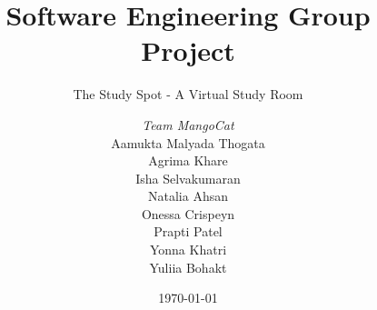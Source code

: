 \documentclass[a4paper, 12pt]{report}
\title{Software Engineering Group Project}
\subtitle{The Study Spot - A Virtual Study Room}%
\author{\textit{Team MangoCat}\\   %
Aamukta Malyada Thogata\\                        %
Agrima Khare\\                        %
Isha Selvakumaran\\                      %
Natalia Ahsan\\                       %
Onessa Crispeyn\\                       %
Prapti Patel\\                        %
Yonna Khatri\\                      %
Yuliia Bohakt\\                      %
}
\date{\today}
\begin{document}
    \maketitle
    \romantableofcontents

    
    
    
    
    
    

    \appendix
\end{document}
